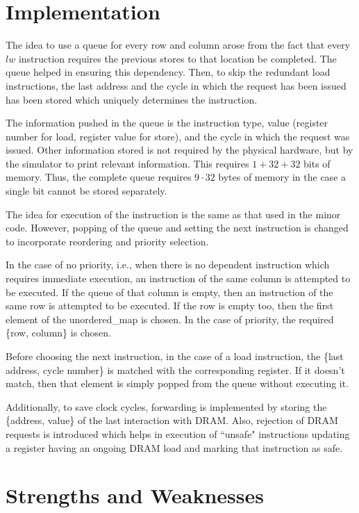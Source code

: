 \documentclass{article}
\begin{document}

\section{Implementation}
The idea to use a queue for every row and column arose from the fact that every $lw$ instruction requires the previous stores to that location be completed. The queue helped in ensuring this dependency. Then, to skip the redundant load instructions, the last address and the cycle in which the request has been issued has been stored which uniquely determines the instruction.\par
The information pushed in the queue is the instruction type, value (register number for load, register value for store), and the cycle in which the request was issued. Other information stored is not required by the physical hardware, but by the simulator to print relevant information. This requires $1+32+32$ bits of memory. Thus, the complete queue requires $9\cdot32$ bytes of memory in the case a single bit cannot be stored separately.\par
The idea for execution of the instruction is the same as that used in the minor code. However, popping of the queue and setting the next instruction is changed to incorporate reordering and priority selection.\par
In the case of no priority, i.e., when there is no dependent instruction which requires immediate execution, an instruction of the same column is attempted to be executed. If the queue of that column is empty, then an instruction of the same row is attempted to be executed. If the row is empty too, then the first element of the unordered\_map is chosen. In the case of priority, the required \{row, column\} is chosen.\par
Before choosing the next instruction, in the case of a load instruction, the \{last address, cycle number\} is matched with the corresponding register. If it doesn't match, then that element is simply popped from the queue without executing it.\par
Additionally, to save clock cycles, forwarding is implemented by storing the \{address, value\} of the last interaction with DRAM. Also, rejection of DRAM requests is introduced which helps in execution of ``unsafe" instructions updating a register having an ongoing DRAM load and marking that instruction as safe.


\section{Strengths and Weaknesses}
\end{document}

